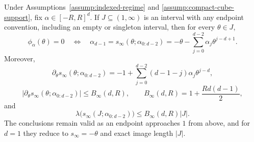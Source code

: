 \begin{proposition}
\label{prop:positive-outer-certificate}
Under Assumptions~\ref{assump:indexed-regime} and
\ref{assump:compact-cube-support}, fix $\alpha\in[-R,R]^d$.  If
$J\subseteq(1,\infty)$ is an interval with any endpoint convention, including
an empty or singleton interval, then for every $\theta\in J$,
\[
\phi_\alpha(\theta)=0
\quad\Longleftrightarrow\quad
\alpha_{d-1}=s_\infty(\theta;\alpha_{0:d-2})
=-\theta-\sum_{j=0}^{d-2}\alpha_j\theta^{j-d+1}.
\]
Moreover,
\[
\partial_\theta s_\infty(\theta;\alpha_{0:d-2})
=-1+\sum_{j=0}^{d-2}(d-1-j)\alpha_j\theta^{j-d},
\]
\[
\bigl|\partial_\theta s_\infty(\theta;\alpha_{0:d-2})\bigr|
\leq B_\infty(d,R),\qquad B_\infty(d,R)=1+\frac{Rd(d-1)}2,
\]
and
\[
\lambda\bigl(s_\infty(J;\alpha_{0:d-2})\bigr)
\leq B_\infty(d,R)|J|.
\]
The conclusions remain valid as an endpoint approaches $1$ from above, and
for $d=1$ they reduce to $s_\infty=-\theta$ and exact image length $|J|$.
\end{proposition}

